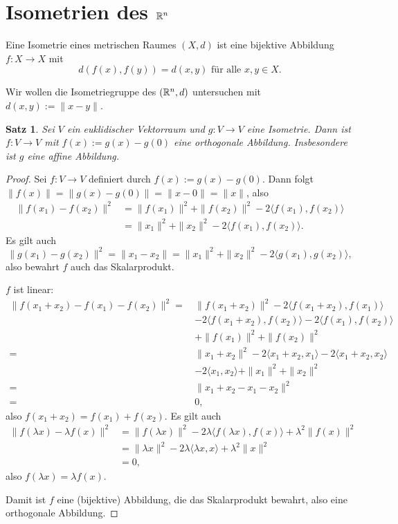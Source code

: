 \documentclass[
 a4paper,
 12pt,
 parskip=half
 ]{scrartcl}
\theoremstyle{plain}
\newtheorem{thm}{Satz}[section] %
\theoremstyle{definition}
\numberwithin{equation}{section}
\begin{document}
\setcounter{secnumdepth}{1}
\section{Isometrien des \texorpdfstring{$\mathbb{R}^n$}{Rn}}
Eine Isometrie eines metrischen Raumes $(X, d)$ ist eine bijektive Abbildung $f: X \to X$ mit
\[ d( f(x), f(y) ) = d(x,y) \text{ für alle } x, y \in X. \]

Wir wollen die Isometriegruppe des $(\mathbb{R}^n, d)$ untersuchen mit $d(x,y) := \| x - y \|$.

\begin{thm}
 Sei $V$ ein euklidischer Vektorraum und $g: V \to V$ eine Isometrie. Dann ist $f: V \to V$ mit $f(x) := g(x) - g(0)$ eine orthogonale Abbildung. Insbesondere ist $g$ eine affine Abbildung.
\end{thm}

\begin{proof}
 Sei $f: V \to V$ definiert durch $f(x) := g(x) - g(0)$. Dann folgt $\| f(x) \| = \| g(x) - g(0) \| = \| x - 0 \| = \| x \|$, also
 \begin{align*}
\| f(x_1) - f(x_2) \|^2 
    &= \| f(x_1) \|^2 + \| f(x_2) \|^2 - 2 \langle f(x_1), f(x_2) \rangle \\
    &= \| x_1 \|^2 + \| x_2 \|^2 - 2 \langle f(x_1), f(x_2) \rangle.
 \end{align*}
 Es gilt auch
 \[ \| g(x_1) - g(x_2) \|^2 = \| x_1 - x_2 \| = \| x_1 \|^2 + \| x_2 \|^2 - 2 \langle g(x_1), g(x_2) \rangle, \]
 also bewahrt $f$ auch das Skalarprodukt.
 
 $f$ ist linear:
 \begin{align*} \| f(x_1 + x_2) - f(x_1) - f(x_2) \|^2 
    =\, &\| f(x_1 + x_2) \|^2 
      - 2 \langle f(x_1 + x_2), f(x_1) \rangle \\
    & - 2 \langle f(x_1 + x_2), f(x_2) \rangle
      - 2 \langle f(x_1 ), f(x_2) \rangle \\
    & + \| f(x_1) \|^2 + \| f(x_2) \|^2 \\
    =\, &\| x_1 + x_2 \|^2 
      - 2 \langle x_1 + x_2, x_1 \rangle
      - 2 \langle x_1 + x_2, x_2 \rangle \\
    & - 2 \langle x_1, x_2 \rangle
      + \| x_1 \|^2 + \| x_2 \|^2 \\
    =\, &\| x_1 + x_2 - x_1 - x_2 \|^2 \\
    =\, &0,
 \end{align*}
 also $f(x_1 + x_2) = f(x_1) + f(x_2)$. Es gilt auch
 \begin{align*} \| f(\lambda x) - \lambda f(x) \|^2 &= \| f( \lambda x ) \|^2 
      - 2 \lambda \langle f( \lambda x ), f( x ) \rangle 
      + \lambda^2 \| f(x) \|^2 \\
    &= \| \lambda x \|^2
      - 2 \lambda \langle \lambda x, x \rangle
      + \lambda^2 \| x \|^2 \\
    &= 0,
 \end{align*}
 also $f(\lambda x) = \lambda f(x)$.
 
 Damit ist $f$ eine (bijektive) Abbildung, die das Skalarprodukt bewahrt, also eine orthogonale Abbildung.
\end{proof}
\end{document}
